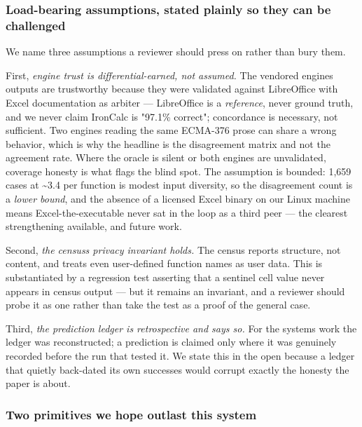 \documentclass[
]{article}
\begin{document}
\subsubsection{Load-bearing assumptions, stated plainly so they can be
challenged}\label{load-bearing-assumptions-stated-plainly-so-they-can-be-challenged}

We name three assumptions a reviewer should press on rather than bury
them.

First, \emph{engine trust is differential-earned, not assumed.} The
vendored engine\textquotesingle s outputs are trustworthy because they
were validated against LibreOffice with Excel documentation as arbiter
--- LibreOffice is a \emph{reference}, never ground truth, and we never
claim IronCalc is "97.1\% correct"; concordance is necessary, not
sufficient. Two engines reading the same ECMA-376 prose can share a
wrong behavior, which is why the headline is the disagreement matrix and
not the agreement rate. Where the oracle is silent or both engines are
unvalidated, coverage honesty is what flags the blind spot. The
assumption is bounded: 1,659 cases at \textasciitilde3.4 per function is
modest input diversity, so the disagreement count is a \emph{lower
bound}, and the absence of a licensed Excel binary on our Linux machine
means Excel-the-executable never sat in the loop as a third peer --- the
clearest strengthening available, and future work.

Second, \emph{the census\textquotesingle s privacy invariant holds.} The
census reports structure, not content, and treats even user-defined
function names as user data. This is substantiated by a regression test
asserting that a sentinel cell value never appears in census output ---
but it remains an invariant, and a reviewer should probe it as one
rather than take the test as a proof of the general case.

Third, \emph{the prediction ledger is retrospective and says so.} For
the systems work the ledger was reconstructed; a prediction is claimed
only where it was genuinely recorded before the run that tested it. We
state this in the open because a ledger that quietly back-dated its own
successes would corrupt exactly the honesty the paper is about.

\subsubsection{Two primitives we hope outlast this
system}\label{two-primitives-we-hope-outlast-this-system}
\end{document}
